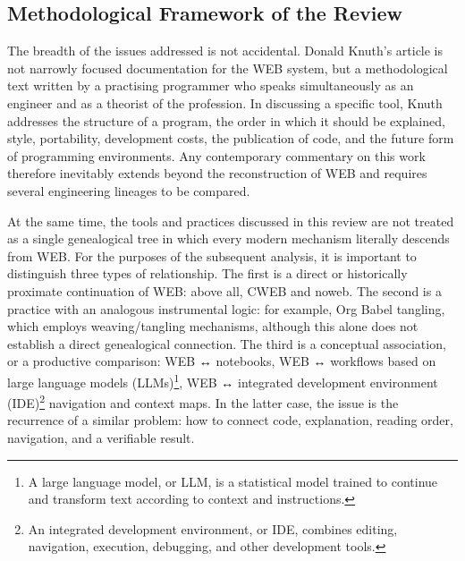 \documentclass{ZGJournalArticle_2026}
\begin{document}
\titlesection %

\subsection{Methodological Framework of the
Review}\label{methodological-framework-of-the-review}

The breadth of the issues addressed is not accidental. Donald Knuth's
article is not narrowly focused documentation for the WEB system, but a
methodological text written by a practising programmer who speaks
simultaneously as an engineer and as a theorist of the profession. In
discussing a specific tool, Knuth addresses the structure of a program,
the order in which it should be explained, style, portability,
development costs, the publication of code, and the future form of
programming environments. Any contemporary commentary on this work
therefore inevitably extends beyond the reconstruction of WEB and
requires several engineering lineages to be compared.

At the same time, the tools and practices discussed in this review are
not treated as a single genealogical tree in which every modern
mechanism literally descends from WEB. For the purposes of the
subsequent analysis, it is important to distinguish three types of
relationship. The first is a direct or historically proximate
continuation of WEB: above all, CWEB and noweb. The second is a practice
with an analogous instrumental logic: for example, Org Babel tangling,
which employs weaving/tangling mechanisms, although this alone does not
establish a direct genealogical connection. The third is a conceptual
association, or a productive comparison: WEB ↔ notebooks, WEB ↔
workflows based on large language models (LLMs)\footnote{A large
  language model, or LLM, is a statistical model trained to continue and
  transform text according to context and instructions.}, WEB ↔
integrated development environment (IDE)\footnote{An integrated
  development environment, or IDE, combines editing, navigation,
  execution, debugging, and other development tools.} navigation and
context maps. In the latter case, the issue is the recurrence of a
similar problem: how to connect code, explanation, reading order,
navigation, and a verifiable result.
\end{document}
